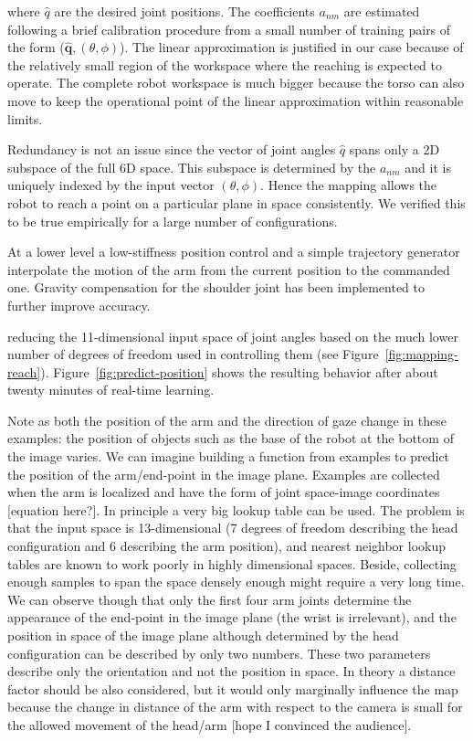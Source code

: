 \noindent where $\hat{q}$ are the desired joint positions. The coefficients
$a_{nm}$ are estimated following a brief calibration procedure from a small 
number of training pairs of the form ($\mathbf{\hat{q}}, (\theta, \phi)$).
The linear approximation is justified in our case because of the relatively small 
region of the workspace where the reaching is expected to operate. The 
complete robot workspace is much bigger because the torso can also move to keep
the operational point of the linear approximation within reasonable limits.

\ifrev
Redundancy is not an issue since the vector of joint angles $\hat{q}$ spans only 
a $\textrm{2D}$ subspace of the full $\textrm{6D}$ space. This subspace is
determined by the $a_{nm}$ and it is uniquely indexed by the input vector 
$(\theta, \phi)$. Hence the mapping allows the robot to reach a point on a
particular plane in space consistently. We verified this to be true empirically 
for a large number of configurations.
\fi

At a lower level a low-stiffness position control and a simple trajectory generator
interpolate the motion of the arm from the current position to the commanded one.
Gravity compensation for the shoulder joint has been implemented to further 
improve accuracy.

\ifverbose
reducing the 11-dimensional input space of joint angles based on 
the much lower number of degrees of freedom used in controlling them
(see Figure~\ref{fig:mapping-reach}).
Figure~\ref{fig:predict-position} shows the resulting behavior
after about twenty minutes of real-time learning. 
\fi

%
\ifverbose
Note as both the
position of the arm and the direction of gaze change in these
examples: the position of objects such as the base of the robot at the
bottom of the image varies.
\fi
%
\ifverbose
We can imagine building a function from examples to predict the
position of the arm/end-point in the image plane. Examples are
collected when the arm is localized and have the form of joint
space-image coordinates [equation here?]. In principle a very big
lookup table can be used. The problem is that the input space is
13-dimensional (7 degrees of freedom describing the head configuration
and 6 describing the arm position), and nearest neighbor lookup tables
are known to work poorly in highly dimensional spaces. Beside,
collecting enough samples to span the space densely enough might
require a very long time. We can observe though that only the first
four arm joints determine the appearance of the end-point in the image
plane (the wrist is irrelevant), and the position in space of the
image plane although determined by the head configuration can be
described by only two numbers. These two parameters describe only the
orientation and not the position in space. In theory a distance factor
should be also considered, but it would only marginally influence the
map because the change in distance of the arm with respect to the
camera is small for the allowed movement of the head/arm [hope I
convinced the audience].
\fi


